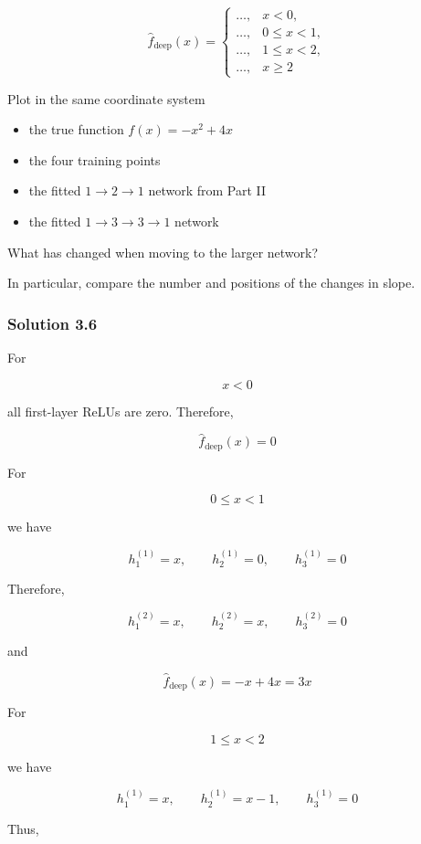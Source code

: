 \documentclass[10pt]{article}
\begin{document}
\[
\hat f_{\mathrm{deep}}(x)=
\begin{cases}
\ldots, & x<0,\\
\ldots, & 0\leq x<1,\\
\ldots, & 1\leq x<2,\\
\ldots, & x\geq2
\end{cases}
\]

Plot in the same coordinate system

\begin{itemize}
\item
the true function $f(x)=-x^2+4x$

\item
the four training points

\item
the fitted $1\rightarrow2\rightarrow1$ network from Part II

\item
the fitted $1\rightarrow3\rightarrow3\rightarrow1$ network

\end{itemize}
What has changed when moving to the larger network?

In particular, compare the number and positions of the changes in slope.

\begingroup\color{red}

\subsubsection*{Solution 3.6}
For

\[
x<0
\]

all first-layer ReLUs are zero. Therefore,

\[
\hat f_{\mathrm{deep}}(x)=0
\]

For

\[
0\leq x<1
\]

we have

\[
h^{(1)}_1=x,
\qquad
h^{(1)}_2=0,
\qquad
h^{(1)}_3=0
\]

Therefore,

\[
h^{(2)}_1=x,
\qquad
h^{(2)}_2=x,
\qquad
h^{(2)}_3=0
\]

and

\[
\hat f_{\mathrm{deep}}(x)=-x+4x=3x
\]

For

\[
1\leq x<2
\]

we have

\[
h^{(1)}_1=x,
\qquad
h^{(1)}_2=x-1,
\qquad
h^{(1)}_3=0
\]

Thus,
\end{document}

